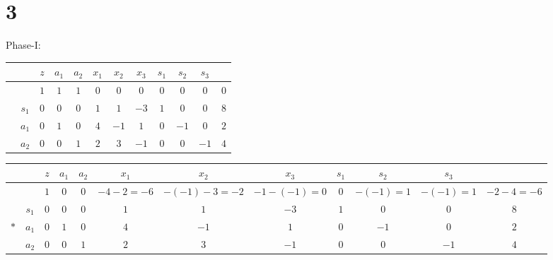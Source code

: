 \documentclass[a4paper,12pt]{article}
\begin{document}
\section*{3}
Phase-I:
\begin{table}[H]
    \tiny
    \begin{tabularx}{\textwidth}{cc|ccccccccc|c}
         &       & $z$ & $a_1$ & $a_2$ & $x_1$ & $x_2$ & $x_3$ & $s_1$ & $s_2$ & $s_3$ &     \\
        \hline
         &       & $1$ & $1$   & $1$   & $0$   & $0$   & $0$   & $0$   & $0$   & $0$   & $0$ \\
        \hline
         & $s_1$ & $0$ & $0$   & $0$   & $1$   & $1$   & $-3$  & $1$   & $0$   & $0$   & $8$ \\
         & $a_1$ & $0$ & $1$   & $0$   & $4$   & $-1$  & $1$   & $0$   & $-1$  & $0$   & $2$ \\
         & $a_2$ & $0$ & $0$   & $1$   & $2$   & $3$   & $-1$  & $0$   & $0$   & $-1$  & $4$ \\
    \end{tabularx}
\end{table}

\begin{table}[H]
    \tiny
    \begin{tabularx}{\textwidth}{cc|ccccccccc|c}
            &       & $z$ & $a_1$ & $a_2$ & $x_1$          & $x_2$             & $x_3$            & $s_1$ & $s_2$        & $s_3$        &                \\
        \hline
            &       & $1$ & $0$   & $0$   & $- 4 - 2 = -6$ & $- (-1) - 3 = -2$ & $- 1 - (-1) = 0$ & $0$   & $- (-1) = 1$ & $- (-1) = 1$ & $- 2 - 4 = -6$ \\
        \hline
            & $s_1$ & $0$ & $0$   & $0$   & $1$            & $1$               & $-3$             & $1$   & $0$          & $0$          & $8$            \\
        $*$ & $a_1$ & $0$ & $1$   & $0$   & $4$            & $-1$              & $1$              & $0$   & $-1$         & $0$          & $2$            \\
            & $a_2$ & $0$ & $0$   & $1$   & $2$            & $3$               & $-1$             & $0$   & $0$          & $-1$         & $4$            \\
    \end{tabularx}
\end{table}
\end{document}
